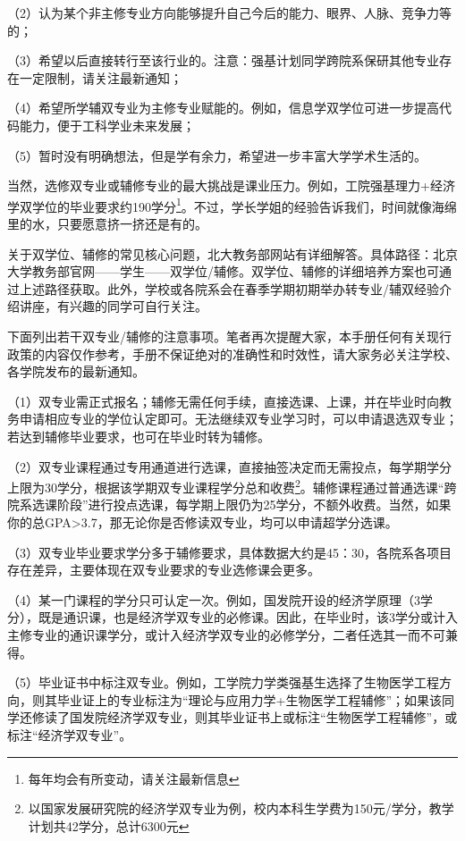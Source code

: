 \documentclass[11pt,oneside]{book}
\begin{document}
（2）认为某个非主修专业方向能够提升自己今后的能力、眼界、人脉、竞争力等的；

（3）希望以后直接转行至该行业的。注意：强基计划同学跨院系保研其他专业存在一定限制，请关注最新通知；

（4）希望所学辅双专业为主修专业赋能的。例如，信息学双学位可进一步提高代码能力，便于工科学业未来发展；

（5）暂时没有明确想法，但是学有余力，希望进一步丰富大学学术生活的。

\vspace{20pt}

当然，选修双专业或辅修专业的最大挑战是课业压力。例如，工院强基理力+经济学双学位的毕业要求约190学分\footnote{每年均会有所变动，请关注最新信息}。不过，学长学姐的经验告诉我们，时间就像海绵里的水，只要愿意挤一挤还是有的。

关于双学位、辅修的常见核心问题，北大教务部网站有详细解答。具体路径：北京大学教务部官网——学生——双学位/辅修。双学位、辅修的详细培养方案也可通过上述路径获取。此外，学校或各院系会在春季学期初期举办转专业/辅双经验介绍讲座，有兴趣的同学可自行关注。

\vspace{20pt}

下面列出若干双专业/辅修的注意事项。笔者再次提醒大家，本手册任何有关现行政策的内容仅作参考，手册不保证绝对的准确性和时效性，请大家务必关注学校、各学院发布的最新通知。

（1）双专业需正式报名；辅修无需任何手续，直接选课、上课，并在毕业时向教务申请相应专业的学位认定即可。无法继续双专业学习时，可以申请退选双专业；若达到辅修毕业要求，也可在毕业时转为辅修。

（2）双专业课程通过专用通道进行选课，直接抽签决定而无需投点，每学期学分上限为30学分，根据该学期双专业课程学分总和收费\footnote{以国家发展研究院的经济学双专业为例，校内本科生学费为150元/学分，教学计划共42学分，总计6300元}。辅修课程通过普通选课“跨院系选课阶段”进行投点选课，每学期上限仍为25学分，不额外收费。当然，如果你的总GPA>3.7，那无论你是否修读双专业，均可以申请超学分选课。

（3）双专业毕业要求学分多于辅修要求，具体数据大约是45：30，各院系各项目存在差异，主要体现在双专业要求的专业选修课会更多。

（4）某一门课程的学分只可认定一次。例如，国发院开设的经济学原理（3学分），既是通识课，也是经济学双专业的必修课。因此，在毕业时，该3学分或计入主修专业的通识课学分，或计入经济学双专业的必修学分，二者任选其一而不可兼得。

（5）毕业证书中标注双专业。例如，工学院力学类强基生选择了生物医学工程方向，则其毕业证上的专业标注为“理论与应用力学+生物医学工程辅修”；如果该同学还修读了国发院经济学双专业，则其毕业证书上或标注“生物医学工程辅修”，或标注“经济学双专业”。
\end{document}
